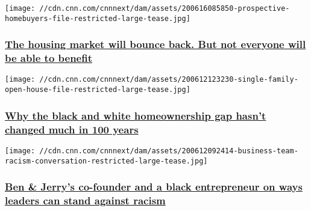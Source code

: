 \texttt{[image: //cdn.cnn.com/cnnnext/dam/assets/200616085850-prospective-homebuyers-file-restricted-large-tease.jpg]}

\hypertarget{the-housing-market-will-bounce-back-but-not-everyone-will-be-able-to-benefit}{%
\subsubsection{\texorpdfstring{\href{/2020/06/16/perspectives/housing-market-pandemic/index.html}{The
housing market will bounce back. But not everyone will be able to
benefit}}{The housing market will bounce back. But not everyone will be able to benefit}}\label{the-housing-market-will-bounce-back-but-not-everyone-will-be-able-to-benefit}}

\href{/2020/06/15/perspectives/housing-discrimination/index.html}{}

\texttt{[image: //cdn.cnn.com/cnnnext/dam/assets/200612123230-single-family-open-house-file-restricted-large-tease.jpg]}

\hypertarget{why-the-black-and-white-homeownership-gap-hasnt-changed-much-in-100-years}{%
\subsubsection{\texorpdfstring{\href{/2020/06/15/perspectives/housing-discrimination/index.html}{Why
the black and white homeownership gap hasn't changed much in 100
years}}{Why the black and white homeownership gap hasn't changed much in 100 years}}\label{why-the-black-and-white-homeownership-gap-hasnt-changed-much-in-100-years}}

\href{/2020/06/12/perspectives/business-leaders-stand-against-racism/index.html}{}

\texttt{[image: //cdn.cnn.com/cnnnext/dam/assets/200612092414-business-team-racism-conversation-restricted-large-tease.jpg]}

\hypertarget{ben--jerrys-co-founder-and-a-black-entrepreneur-on-ways-leaders-can-stand-against-racism}{%
\subsubsection{\texorpdfstring{\href{/2020/06/12/perspectives/business-leaders-stand-against-racism/index.html}{Ben
\& Jerry's co-founder and a black entrepreneur on ways leaders can stand
against
racism}}{Ben \& Jerry's co-founder and a black entrepreneur on ways leaders can stand against racism}}\label{ben--jerrys-co-founder-and-a-black-entrepreneur-on-ways-leaders-can-stand-against-racism}}

